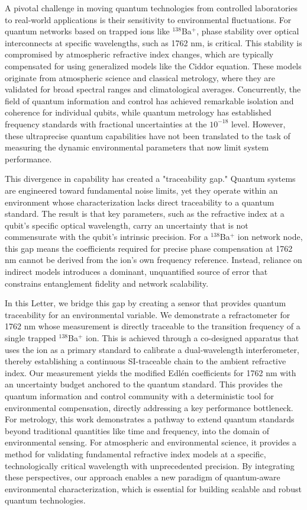 \documentclass[aps,pra,reprint,groupedaddress,twocolumn,superscriptaddress,linenumbers]{revtex4-2}
\begin{document}
A pivotal challenge in moving quantum technologies from controlled laboratories to real-world applications is their sensitivity to environmental fluctuations. For quantum networks based on trapped ions like $^{138}$Ba$^+$, phase stability over optical interconnects at specific wavelengths, such as 1762 nm, is critical. This stability is compromised by atmospheric refractive index changes, which are typically compensated for using generalized models like the Ciddor equation. These models originate from atmospheric science and classical metrology, where they are validated for broad spectral ranges and climatological averages. Concurrently, the field of quantum information and control has achieved remarkable isolation and coherence for individual qubits, while quantum metrology has established frequency standards with fractional uncertainties at the $10^{-18}$ level. However, these ultraprecise quantum capabilities have not been translated to the task of measuring the dynamic environmental parameters that now limit system performance.

This divergence in capability has created a "traceability gap." Quantum systems are engineered toward fundamental noise limits, yet they operate within an environment whose characterization lacks direct traceability to a quantum standard. The result is that key parameters, such as the refractive index at a qubit's specific optical wavelength, carry an uncertainty that is not commensurate with the qubit's intrinsic precision. For a $^{138}$Ba$^+$ ion network node, this gap means the coefficients required for precise phase compensation at 1762 nm cannot be derived from the ion's own frequency reference. Instead, reliance on indirect models introduces a dominant, unquantified source of error that constrains entanglement fidelity and network scalability.

In this Letter, we bridge this gap by creating a sensor that provides quantum traceability for an environmental variable. We demonstrate a refractometer for 1762 nm whose measurement is directly traceable to the transition frequency of a single trapped $^{138}$Ba$^+$ ion. This is achieved through a co-designed apparatus that uses the ion as a primary standard to calibrate a dual-wavelength interferometer, thereby establishing a continuous SI-traceable chain to the ambient refractive index. Our measurement yields the modified Edlén coefficients for 1762 nm with an uncertainty budget anchored to the quantum standard. This provides the quantum information and control community with a deterministic tool for environmental compensation, directly addressing a key performance bottleneck. For metrology, this work demonstrates a pathway to extend quantum standards beyond traditional quantities like time and frequency, into the domain of environmental sensing. For atmospheric and environmental science, it provides a method for validating fundamental refractive index models at a specific, technologically critical wavelength with unprecedented precision. By integrating these perspectives, our approach enables a new paradigm of quantum-aware environmental characterization, which is essential for building scalable and robust quantum technologies.
\end{document}
